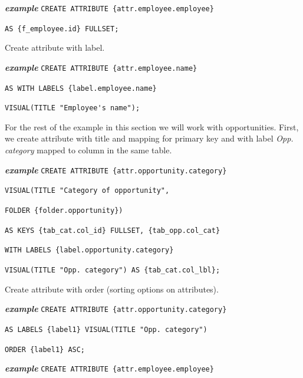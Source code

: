 \documentclass[a4paper, 12pt, titlepage, fleqn]{article}
\begin{document}
\textbf{\emph{example}}  \hspace{.9cm}\verb=CREATE ATTRIBUTE {attr.employee.employee}=

\hspace{2.5cm}\verb=AS {f_employee.id} FULLSET;=

\noindent Create attribute with label.

\textbf{\emph{example}}  \hspace{.9cm}\verb=CREATE ATTRIBUTE {attr.employee.name}=

\hspace{2.5cm}\verb=AS WITH LABELS {label.employee.name}=

\hspace{2.5cm}\verb=VISUAL(TITLE "Employee's name");=

\noindent For the rest of the example in this section we will work with opportunities. First, we create attribute with title and mapping for primary key and with label \emph{Opp. category} mapped to column in the same table.

\textbf{\emph{example}}  \hspace{.9cm}\verb=CREATE ATTRIBUTE {attr.opportunity.category}=

\hspace{2.5cm}\verb=VISUAL(TITLE "Category of opportunity",=

\hspace{2.5cm}\verb=FOLDER {folder.opportunity}) =

\hspace{2.5cm}\verb=AS KEYS {tab_cat.col_id} FULLSET, {tab_opp.col_cat}=

\hspace{2.5cm}\verb=WITH LABELS {label.opportunity.category}=

\hspace{2.5cm}\verb=VISUAL(TITLE "Opp. category") AS {tab_cat.col_lbl};=

\noindent Create attribute with order (sorting options on attributes).

\textbf{\emph{example}}  \hspace{.9cm}\verb=CREATE ATTRIBUTE {attr.opportunity.category}=

\hspace{2.5cm}\verb=AS LABELS {label1} VISUAL(TITLE "Opp. category")=

\hspace{2.5cm}\verb=ORDER {label1} ASC;=

\textbf{\emph{example}}  \hspace{.9cm}\verb=CREATE ATTRIBUTE {attr.employee.employee}=
\end{document}
